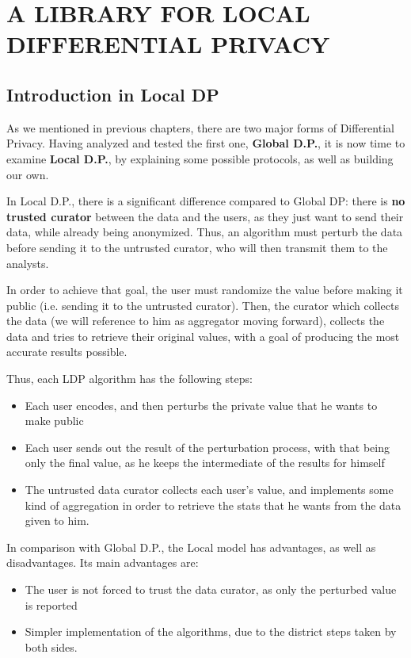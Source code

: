 \chapter{A LIBRARY FOR LOCAL DIFFERENTIAL PRIVACY}

\section{Introduction in Local DP}

As we mentioned in previous chapters, there are two major forms of Differential Privacy. Having analyzed and tested the first one, \textbf{Global D.P.}, it is now time to examine \textbf{Local D.P.}, by explaining some possible protocols, as well as building our own.


In Local D.P., there is a significant difference compared to Global DP: there is \textbf{no trusted curator} between the data and the users, as they just want to send their data, while already being anonymized. Thus, an algorithm must perturb the data before sending it to the untrusted curator, who will then transmit them to the analysts. 

In order to achieve that goal, the user must randomize the value before making it public (i.e. sending it to the untrusted curator). Then, the curator which collects the data (we will reference to him as aggregator moving forward), collects the data and tries to retrieve their original values, with a goal of producing the most accurate results possible. 

Thus, each LDP algorithm has the following steps:

\begin{itemize}
    \item Each user encodes, and then perturbs the private value that he wants to make public
    \item Each user sends out the result of the perturbation process, with that being only the final value, as he keeps the intermediate of the results for himself
    \item The untrusted data curator collects each user's value, and implements some kind of aggregation in order to retrieve the stats that he wants from the data given to him.
\end{itemize}

In comparison with Global D.P., the Local model has advantages, as well as disadvantages. 
Its main advantages are:
\begin{itemize}
    \item The user is not forced to trust the data curator, as only the perturbed value is reported
    \item Simpler implementation of the algorithms, due to the district steps taken by both sides.
\end{itemize}

